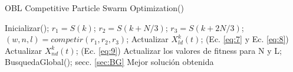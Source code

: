\begin{algorithm}[!ht]
  \caption{OBL Competitive Particle Swarm Optimization(\mbox{})}
  \label{pseu:oblcpso}
  \begin{algorithmic}[1]
    \STATE Inicializar();
        \STATE $ r_{1} = S(k)$;
        \STATE $ r_{2} = S(k + N/3)$;
        \STATE $ r_{3} = S(k + 2N/3)$;
        \STATE $(w, n, l) = competir(r_{1}, r_{2}, r_{3})$;
        \STATE Actualizar $ X^{k}_{ld}(t)$; (Ec. \ref{eq:7} y Ec. \ref{eq:8})
        \STATE Actualizar $ X^{k}_{nd}(t)$; (Ec. \ref{eq:9})
        \STATE Actualizar los valores de fitness para N y L;
      \ENDFOR
      \STATE BusquedaGlobal(); secc. \ref{sec:BG}
    \ENDWHILE
    \RETURN Mejor solución obtenida
  \end{algorithmic}
\end{algorithm}